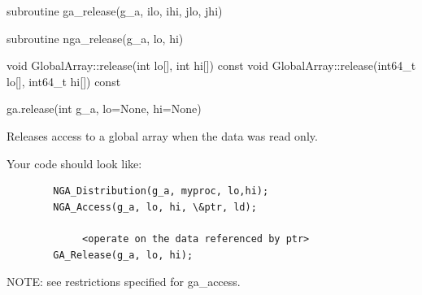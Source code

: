 \documentclass[10pt]{article}
\begin{document}
\begin{f2dapi}
\begin{fcode}
subroutine ga_release(g_a, ilo, ihi, jlo, jhi)
\end{fcode}
\begin{funcargs}
\end{funcargs}
\end{f2dapi}

\begin{fapi}
\begin{fcode}
subroutine nga_release(g_a, lo, hi)
\end{fcode}
\begin{funcargs}
\end{funcargs}
\end{fapi}

\begin{cxxapi}
\begin{cxxcode}
void GlobalArray::release(int lo[], int hi[]) const
void GlobalArray::release(int64_t lo[], int64_t hi[]) const
\end{cxxcode}
\begin{funcargs}
\end{funcargs}
\end{cxxapi}

\begin{pyapi}
\begin{pycode}
ga.release(int g_a, lo=None, hi=None)
\end{pycode}
\begin{funcargs}
\end{funcargs}
\end{pyapi}

\local

\begin{desc}

Releases access to a global array when the data was read only.

Your code should look like:
\begin{verbatim}
        NGA_Distribution(g_a, myproc, lo,hi);
        NGA_Access(g_a, lo, hi, \&ptr, ld);

             <operate on the data referenced by ptr>
        GA_Release(g_a, lo, hi);
\end{verbatim}
NOTE: see restrictions specified for ga_access.

\end{desc}
\end{document}
